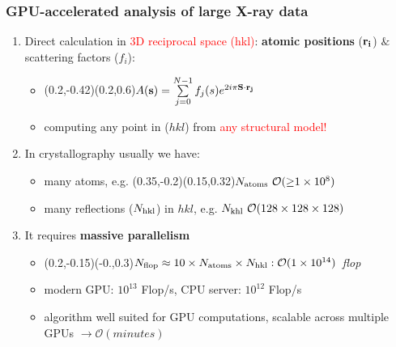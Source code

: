 \documentclass[]{beamer}
\begin{document}
\begin{frame}
    \frametitle{GPU-accelerated analysis of large X-ray data}
        \begin{enumerate}
                \item<1-> Direct calculation in \textcolor{red}{3D reciprocal space (hkl)}: \textbf{atomic positions} (${\bf r_{i}}$) $\&$ scattering factors ($f_{i}$):
                    \begin{itemize}
                        \item {}(0.2,-0.42)(0.2,0.6)$A({\bf s}) = \sum\limits_{j=0}^{N-1} f_{j}(s) e^{2i\pi {\bf S}\cdot {\bf r_{j}}}$ \hspace*{5mm}\drWalley
                        \item computing any point in ($hkl$) from \textcolor{red}{any structural model!}
                    \end{itemize}
                \item<2-> In crystallography usually we have: 
                    \begin{itemize}
                        \item many atoms, e.g. (0.35,-0.2)(0.15,0.32)$N_{\rm atoms} ~ \mathcal{O}(\num{\geq1e8})$ \hspace*{5mm} \dAnnoey 
                        \item many reflections ($N_{\rm hkl}$) in $hkl$, 
                              e.g. $N_{\rm khl}~\mathcal{O}(128 \times 128 \times 128)$ 
                    \end{itemize}    
                \item<3-> It requires \textbf{massive parallelism} 
                    \begin{itemize}
                        \item {}(0.2,-0.15)(-0.,0.3)$N_{\rm flop} \approx 10 \times N_{\rm atoms} \times N_{\rm hkl}: \mathcal{O}(\num{1e14})$~\textit{flop} \hspace*{5mm}\dNinja%
                        \item \small modern GPU: $10^{13}$ Flop/s, CPU server: $10^{12}$ Flop/s \hspace*{5mm}\dWinkey
                        \item \small algorithm well suited for GPU computations, scalable across multiple GPUs $\rightarrow \mathcal{O}(minutes)$
                    \end{itemize}    
                \end{enumerate}
\end{frame}
\end{document}
